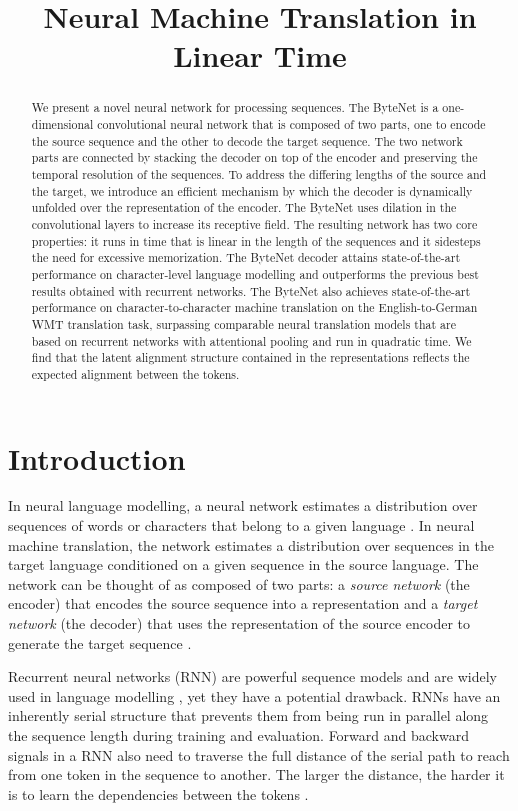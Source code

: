 \title{Neural Machine Translation in Linear Time}

\begin{abstract}
We present a novel neural network for processing sequences. The ByteNet is a one-dimensional convolutional neural network that is composed of two parts, one to encode the source sequence and the other to decode the target sequence. The two network parts are connected by stacking the decoder on top of the encoder and preserving the temporal resolution of the sequences. To address the differing lengths of the source and the target, we introduce an efficient mechanism by which the decoder is dynamically unfolded over the representation of the encoder. The ByteNet uses dilation in the convolutional layers to increase its receptive field. The resulting network has two core properties: it runs in time that is linear in the length of the sequences and it sidesteps the need for excessive memorization. The ByteNet  decoder attains state-of-the-art performance on character-level language modelling and outperforms the previous best results obtained with recurrent networks. The ByteNet also achieves state-of-the-art performance on character-to-character machine translation on the English-to-German WMT translation task, surpassing comparable neural translation models that are based on recurrent networks with attentional pooling and run in quadratic time. We find that the latent alignment structure contained in the representations reflects the expected alignment between the tokens.
\end{abstract}

\section{Introduction}

In neural language modelling, a neural network estimates a distribution over sequences of words or characters that belong to a given language \citep{bengio:2003}. In neural machine translation, the network estimates a distribution over sequences in the target language conditioned on a given sequence in the source language. The network can be thought of as composed of two parts: a \emph{source network} (the encoder) that encodes the source sequence into a representation and a \emph{target network} (the decoder) that uses the representation of the source encoder to generate the target sequence \citep{kalchbrenner13emnlp}.

Recurrent neural networks (RNN) are powerful sequence models \citep{hochreiter1997long} and are widely used in language modelling \citep{DBLP:conf/interspeech/MikolovKBCK10}, yet they have a potential drawback. RNNs have an inherently serial structure that prevents them from being run in parallel along the sequence length during training and evaluation. Forward and backward signals in a RNN also need to traverse the full distance of the serial path to reach from one token in the sequence to another. The larger the distance, the harder it is to learn the dependencies between the tokens \citep{chapter-gradient-flow-2001}.

